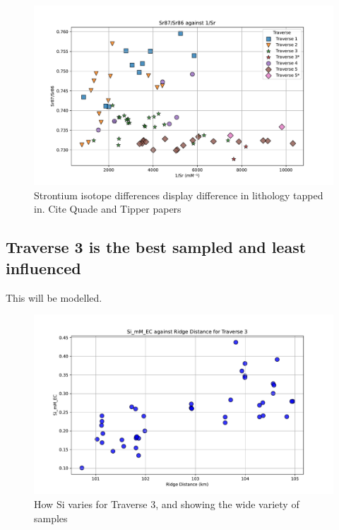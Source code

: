 \begin{figure}[h]
    \centering
    \includegraphics[width=\textwidth]{Sr87_Sr86_1_Sr.pdf}
    \caption{Strontium isotope differences display difference in lithology tapped in. Cite Quade and Tipper papers}
    \label{fig:spatial_changes_spring6}
\end{figure}

\FloatBarrier


\subsection{Traverse 3 is the best sampled and least influenced}
This will be modelled.

\begin{figure}[h]
    \centering
    \includegraphics[width=\textwidth]{Si_mM_EC_Ridge_Distance.pdf}
    \caption{How Si varies for Traverse 3, and showing the wide variety of samples}
    \label{fig:spatial_changes_spring7}
\end{figure}

